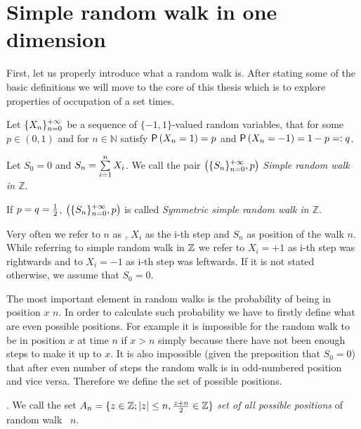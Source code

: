 \chapter{Simple random walk in one dimension}

\begin{rem}
  First, let us properly introduce what a random walk is. After stating some of the basic definitions we will move to the core of this thesis which is to explore properties of occupation of a set times.
\end{rem}

\begin{defn}\label{defn-simple_random_walk_Z}
 Let $\{X_n\}_{n=0}^{+\infty}$ be a sequence of  \iid $\{-1,1\}$-valued random variables, that for some $p\in(0,1)$ and for $n\in \mathbb{N}$ satisfy $\operatorname{\mathsf{P}} \left( X_n=1 \right) =p$ and $\operatorname{\mathsf{P}} \left( X_n=-1 \right) =1-p=:q$.

 Let $S_0=0$ and $S_n=\suma[i][1][n]X_i$. We call the pair $ \left( \{S_n\}_{n=0}^{+\infty}, p \right) $ \emph{Simple random walk in $\mathbb{Z}$}.

 If $p=q=\frac{1}{2} $, $ \left( \{S_n\}_{n=0}^{+\infty}, p \right) $ is called
\emph{Symmetric simple random walk in $\mathbb{Z}$}.
\end{defn}

\begin{rem}
 Very often we refer to $n$ as \Time, $X_i$ as the i-th step and $S_n$ as position of the walk \intime $n$.
 While referring to simple random walk in $\mathbb{Z}$ we refer to $X_i=+1$ as i-th step was rightwards and to $X_i=-1$ as i-th step was leftwards. If it is not stated otherwise, we assume that $S_0=0.$
\end{rem}

\begin{rem}
  The most important element in random walks is the probability of being in position $x$ \intime $n$.
  In order to calculate such probability we have to firstly define what are even possible positions. For example it is impossible for the random walk to be in position $x$ at time $n$ if $x>n$ simply because there have not been enough steps to make it up to $x$. It is also impossible (given the preposition that $S_0=0$) that after even number of steps the random walk is in odd-numbered position and vice versa. Therefore we define the set of possible positions.
\end{rem}

\begin{defn}\label{defn-set_all_possible_values}
 \Lrw. We call the set $A_n=\{z \in \mathbb{Z}; \left|{z}\right|\leq n, \frac{z+n}{2}\in \mathbb{Z} \}$ \emph{set of all possible positions} of random walk \rw\ \intime $n$.
\end{defn}



